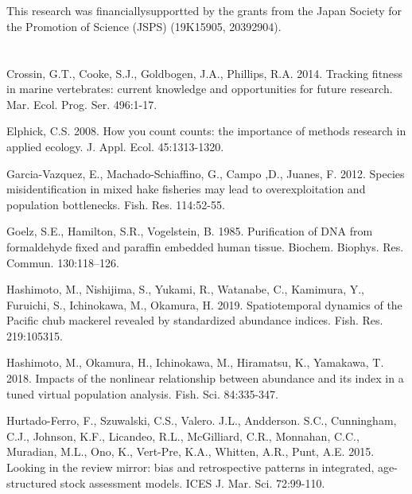 \documentclass[12pt]{article}
\begin{document}
\begin{linenumbers}
\ \\
\\
This research was financiallysupportted by the grants from the Japan Society for the Promotion of Science (JSPS) (19K15905, 20392904).
\ \\

\ \\

\\
\hangindent=30pt
\noindent
Crossin, G.T., Cooke, S.J., Goldbogen, J.A., Phillips, R.A. 2014. Tracking fitness in marine vertebrates: current knowledge and opportunities for future research. Mar. Ecol. Prog. Ser. 496:1-17.

\hangindent=30pt
\noindent
Elphick, C.S. 2008. How you count counts: the importance of methods research in applied ecology. J. Appl. Ecol. 45:1313-1320.

\hangindent=30pt
\noindent
Garcia-Vazquez, E., Machado-Schiaffino, G., Campo ,D., Juanes, F. 2012. Species misidentification in mixed hake fisheries may lead to overexploitation and population bottlenecks. Fish. Res. 114:52-55.

\hangindent=30pt
\noindent
Goelz, S.E., Hamilton, S.R., Vogelstein, B. 1985. Purification of DNA from formaldehyde fixed and paraffin embedded human tissue. Biochem. Biophys. Res. Commun. 130:118–126.

\hangindent=30pt
\noindent
Hashimoto, M., Nishijima, S., Yukami, R., Watanabe, C., Kamimura, Y., Furuichi, S., Ichinokawa, M., Okamura, H. 2019. Spatiotemporal dynamics of the Pacific chub mackerel revealed by standardized abundance indices. Fish. Res. 219:105315.

\hangindent=30pt
\noindent
Hashimoto, M., Okamura, H., Ichinokawa, M., Hiramatsu, K., Yamakawa, T. 2018. Impacts of the nonlinear relationship between abundance and its index in a tuned virtual population analysis. Fish. Sci. 84:335-347.

\hangindent=30pt
\noindent
Hurtado-Ferro, F., Szuwalski, C.S., Valero. J.L., Andderson. S.C., Cunningham, C.J., Johnson, K.F., Licandeo, R.L., McGilliard, C.R., Monnahan, C.C., Muradian, M.L., Ono, K., Vert-Pre, K.A., Whitten, A.R., Punt, A.E. 2015. Looking in the review mirror: bias and retrospective patterns in integrated, age-structured stock assessment models. ICES J. Mar. Sci. 72:99-110.


\end{linenumbers}
\end{document}
